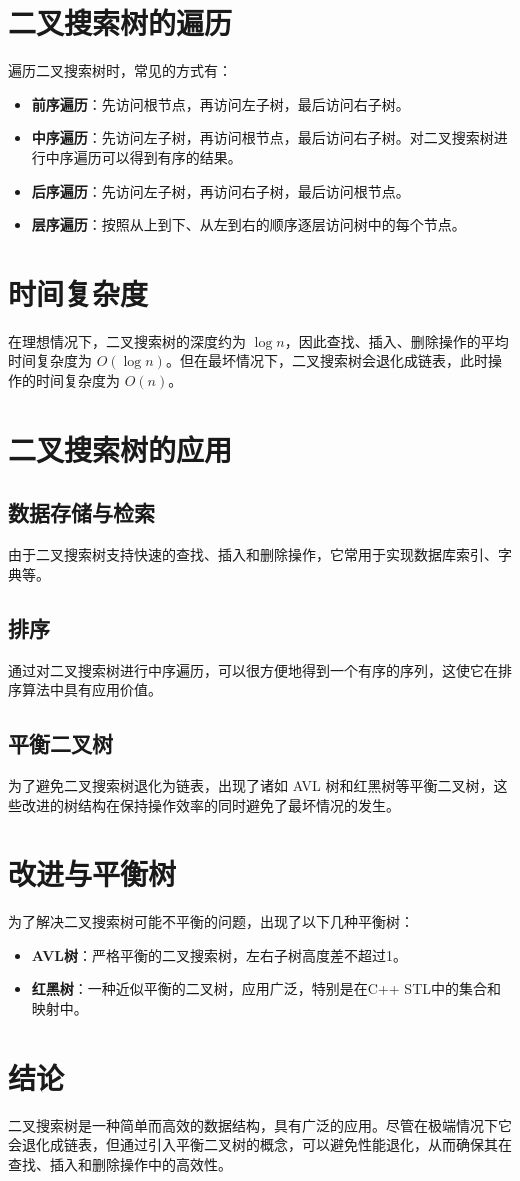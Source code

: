 \documentclass[a4paper,12pt]{report}
\begin{document}
\chapter{二叉搜索树的遍历}
遍历二叉搜索树时，常见的方式有：
\begin{itemize}
    \item \textbf{前序遍历}：先访问根节点，再访问左子树，最后访问右子树。
    \item \textbf{中序遍历}：先访问左子树，再访问根节点，最后访问右子树。对二叉搜索树进行中序遍历可以得到有序的结果。
    \item \textbf{后序遍历}：先访问左子树，再访问右子树，最后访问根节点。
    \item \textbf{层序遍历}：按照从上到下、从左到右的顺序逐层访问树中的每个节点。
\end{itemize}

\chapter{时间复杂度}
在理想情况下，二叉搜索树的深度约为 $\log n$，因此查找、插入、删除操作的平均时间复杂度为 $O(\log n)$。但在最坏情况下，二叉搜索树会退化成链表，此时操作的时间复杂度为 $O(n)$。

\chapter{二叉搜索树的应用}
\section{数据存储与检索}
由于二叉搜索树支持快速的查找、插入和删除操作，它常用于实现数据库索引、字典等。

\section{排序}
通过对二叉搜索树进行中序遍历，可以很方便地得到一个有序的序列，这使它在排序算法中具有应用价值。

\section{平衡二叉树}
为了避免二叉搜索树退化为链表，出现了诸如 AVL 树和红黑树等平衡二叉树，这些改进的树结构在保持操作效率的同时避免了最坏情况的发生。

\chapter{改进与平衡树}
为了解决二叉搜索树可能不平衡的问题，出现了以下几种平衡树：
\begin{itemize}
    \item \textbf{AVL树}：严格平衡的二叉搜索树，左右子树高度差不超过1。
    \item \textbf{红黑树}：一种近似平衡的二叉树，应用广泛，特别是在C++ STL中的集合和映射中。
\end{itemize}

\chapter{结论}
二叉搜索树是一种简单而高效的数据结构，具有广泛的应用。尽管在极端情况下它会退化成链表，但通过引入平衡二叉树的概念，可以避免性能退化，从而确保其在查找、插入和删除操作中的高效性。
\end{document}
